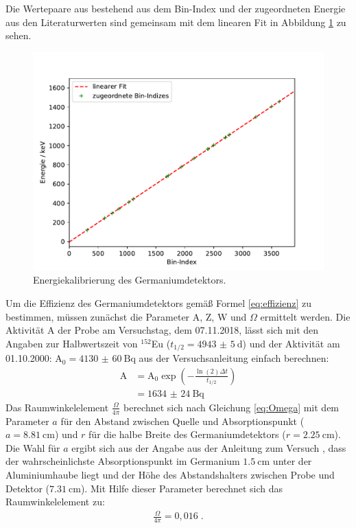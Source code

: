 \noindent Die Wertepaare aus bestehend aus dem Bin-Index und der zugeordneten Energie aus den Literaturwerten sind gemeinsam mit dem linearen Fit in Abbildung \ref{abb:linfit} zu sehen.

\FloatBarrier
\begin{figure}
    \centering
    \includegraphics[scale=0.7]{Kalibrierung.pdf}
    \caption{Energiekalibrierung des Germaniumdetektors.}
    \label{abb:linfit}
\end{figure}
\FloatBarrier

\noindent Um die Effizienz des Germaniumdetektors gemäß Formel \ref{eq:effizienz} zu bestimmen, müssen
zunächst die Parameter A, Z, W und $\Omega$ ermittelt werden.
Die Aktivität A der Probe am Versuchstag, dem 07.11.2018, lässt sich mit den Angaben zur Halbwertszeit von
$^{152}$Eu ($t_{1/2}=\SI{4943(5)}{\day}$) und der Aktivität am 01.10.2000: $\text{A}_0=
\SI{4130(60)}{\becquerel}$ aus der Versuchsanleitung \cite{Q1} einfach berechnen:
\begin{align*}
    \text{A} &= \text{A}_0 \exp \left(-\frac{\ln(2) \Delta t}{t_{1/2}}\right) \\
    &= \SI{1634(24)}{\becquerel}
\end{align*}
Das Raumwinkelelement $\frac{\Omega}{4 \pi}$ berechnet sich nach Gleichung \ref{eq:Omega} mit dem Parameter
$a$ für den Abstand zwischen Quelle und Absorptionspunkt ($a=\SI{8,81}{\centi\meter}$) und $r$ für die halbe
Breite des Germaniumdetektors ($r= \SI{2,25}{\centi \meter}$). Die Wahl für $a$ ergibt sich aus der Angabe
aus der Anleitung zum Versuch \cite{Q1}, dass der wahrscheinlichste Absorptionspunkt im Germanium
$\SI{1,5}{\centi \meter}$ unter der Aluminiumhaube liegt und der Höhe des Abstandshalters zwischen Probe und
Detektor ($\SI{7,31}{\centi \meter}$).
Mit Hilfe dieser Parameter berechnet sich das Raumwinkelelement zu:
\begin{align*}
    \frac{\Omega}{4 \pi} = 0,016 \; .
\end{align*}

